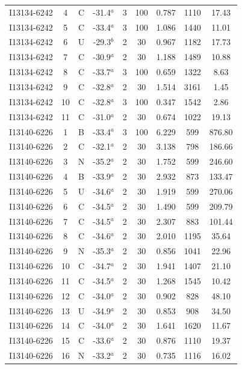 \begin{table}
\begin{tabular}{ccccccccc}
I13134-6242 & 4 & C & -31.4$^{a}$ & 3 & 100 & 0.787 & 1110 & 17.43 \\
I13134-6242 & 5 & C & -33.4$^{a}$ & 3 & 100 & 1.086 & 1440 & 11.01 \\
I13134-6242 & 6 & U & -29.3$^{b}$ & 2 & 30 & 0.967 & 1182 & 17.73 \\
I13134-6242 & 7 & C & -30.9$^{a}$ & 2 & 30 & 1.188 & 1489 & 10.88 \\
I13134-6242 & 8 & C & -33.7$^{a}$ & 3 & 100 & 0.659 & 1322 & 8.63 \\
I13134-6242 & 9 & C & -32.8$^{a}$ & 2 & 30 & 1.514 & 3161 & 1.45 \\
I13134-6242 & 10 & C & -32.8$^{a}$ & 3 & 100 & 0.347 & 1542 & 2.86 \\
I13134-6242 & 11 & C & -31.0$^{a}$ & 2 & 30 & 0.674 & 1022 & 19.13 \\
I13140-6226 & 1 & B & -33.4$^{a}$ & 3 & 100 & 6.229 & 599 & 876.80 \\
I13140-6226 & 2 & C & -32.1$^{a}$ & 2 & 30 & 3.138 & 798 & 186.66 \\
I13140-6226 & 3 & N & -35.2$^{a}$ & 2 & 30 & 1.752 & 599 & 246.60 \\
I13140-6226 & 4 & B & -33.9$^{a}$ & 2 & 30 & 2.932 & 873 & 133.47 \\
I13140-6226 & 5 & U & -34.6$^{a}$ & 2 & 30 & 1.919 & 599 & 270.06 \\
I13140-6226 & 6 & C & -34.5$^{a}$ & 2 & 30 & 1.490 & 599 & 209.79 \\
I13140-6226 & 7 & C & -34.5$^{a}$ & 2 & 30 & 2.307 & 883 & 101.44 \\
I13140-6226 & 8 & C & -34.6$^{a}$ & 2 & 30 & 2.010 & 1195 & 35.64 \\
I13140-6226 & 9 & N & -35.3$^{a}$ & 2 & 30 & 0.856 & 1041 & 22.96 \\
I13140-6226 & 10 & C & -34.7$^{a}$ & 2 & 30 & 1.941 & 1407 & 21.10 \\
I13140-6226 & 11 & C & -34.5$^{a}$ & 2 & 30 & 1.268 & 1545 & 10.42 \\
I13140-6226 & 12 & C & -34.0$^{a}$ & 2 & 30 & 0.902 & 828 & 48.10 \\
I13140-6226 & 13 & U & -34.9$^{a}$ & 2 & 30 & 0.853 & 908 & 34.50 \\
I13140-6226 & 14 & C & -34.0$^{a}$ & 2 & 30 & 1.641 & 1620 & 11.67 \\
I13140-6226 & 15 & C & -33.6$^{a}$ & 2 & 30 & 0.876 & 1110 & 19.37 \\
I13140-6226 & 16 & N & -33.2$^{a}$ & 2 & 30 & 0.735 & 1116 & 16.02 \\

\end{tabular}
\end{table}
